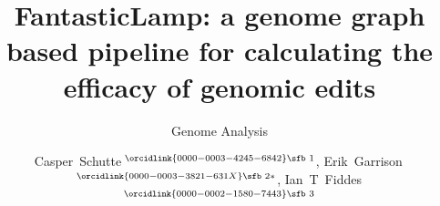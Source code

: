 \documentclass{bioinfo}
\theoremstyle{definition}
\begin{document}

\subtitle{Genome Analysis}

\title[FantasticLamp]{FantasticLamp: a genome graph based pipeline for calculating the efficacy of genomic edits}
\author[Schutte \textit{et~al}.]{

Casper~Schutte\,$^{\orcidlink{0000-0003-4245-6842}\text{\sfb 1}}$,
Erik~Garrison\,$^{\orcidlink{0000-0003-3821-631X}\text{\sfb 2}*}$,
Ian~T~Fiddes\,$^{\orcidlink{0000-0002-1580-7443}\text{\sfb 3}}$

}

\address{
$^{\text{\sf 1}}$Department of Bioinformatics and Computational Biology, University of Stellenbosch, Stellenbosch, 7600, Western Cape, South Africa \\
$^{\text{\sf 2}}$Department of Genetics, Genomics and Informatics, University of Tennessee Health Science Center, Memphis, 38163, Tennessee, USA \\
$^{\text{\sf 3}}$Ian's affiliation goes here \\
%
}



\end{document}
